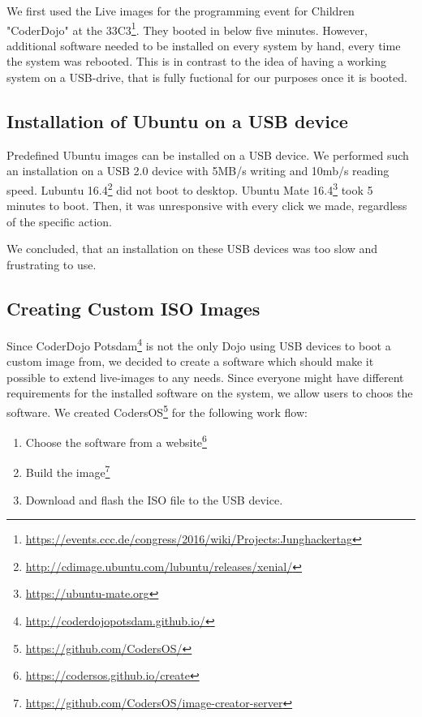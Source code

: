 \documentclass[english]{lni}
\begin{document}
We first used the Live images for the programming event for Children "CoderDojo" at the 33C3\footnote{\url{https://events.ccc.de/congress/2016/wiki/Projects:Junghackertag}}.
They booted in below five minutes.
However, additional software needed to be installed on every system by hand, every time the system  was rebooted.
This is in contrast to the idea of having a working system on a USB-drive, that is fully fuctional for our purposes once it is booted.

\subsection{Installation of Ubuntu on a USB device}

Predefined Ubuntu images can be installed on a USB device.
We performed such an installation on a USB 2.0 device with 5MB/s writing and 10mb/s reading speed.
Lubuntu 16.4\footnote{\url{http://cdimage.ubuntu.com/lubuntu/releases/xenial/}} did not boot to desktop. 
Ubuntu Mate 16.4\footnote{\url{https://ubuntu-mate.org}} took 5 minutes to boot.
Then, it was unresponsive with every click we made, regardless of the specific action.

We concluded, that an installation on these USB devices was too slow and frustrating to use.

\subsection{Creating Custom ISO Images}
\label{sec:custom}

Since CoderDojo Potsdam\footnote{\url{http://coderdojopotsdam.github.io/}} is not the only Dojo using USB devices to boot a custom image from, we decided to create a software which should make it possible to extend live-images to any needs. 
Since everyone might have different requirements for the installed software on the system, we allow users to choos the software.
We created CodersOS\footnote{\url{https://github.com/CodersOS/}} for the following work flow:

\begin{enumerate}
  \item Choose the software from a website\footnote{\url{https://codersos.github.io/create}}
  \item Build the image\footnote{\url{https://github.com/CodersOS/image-creator-server}}
  \item Download and flash the ISO file to the USB device.
\end{enumerate}
\end{document}

